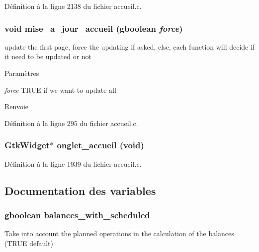 Définition à la ligne 2138 du fichier accueil.c.

\subsubsection[{mise\_\-a\_\-jour\_\-accueil}]{\setlength{\rightskip}{0pt plus 5cm}void mise\_\-a\_\-jour\_\-accueil (gboolean {\em force})}\label{accueil_8c_a15511226739a34542ef8d7b979aedcf0}
update the first page, force the updating if asked, else, each function will decide if it need to be updated or not


\begin{DoxyParams}{Paramètres}
\item[{\em force}]TRUE if we want to update all\end{DoxyParams}
\begin{DoxyReturn}{Renvoie}

\end{DoxyReturn}


Définition à la ligne 295 du fichier accueil.c.

\subsubsection[{onglet\_\-accueil}]{\setlength{\rightskip}{0pt plus 5cm}GtkWidget$\ast$ onglet\_\-accueil (void)}\label{accueil_8c_a2ce3fbe764b92fba9b115271c89ddbb1}


Définition à la ligne 1939 du fichier accueil.c.



\subsection{Documentation des variables}
\subsubsection[{balances\_\-with\_\-scheduled}]{\setlength{\rightskip}{0pt plus 5cm}gboolean {\bf balances\_\-with\_\-scheduled}}\label{accueil_8c_a2f70ab8aa9d2a494c0653e8f29eddf40}
Take into account the planned operations in the calculation of the balances (TRUE default) 

